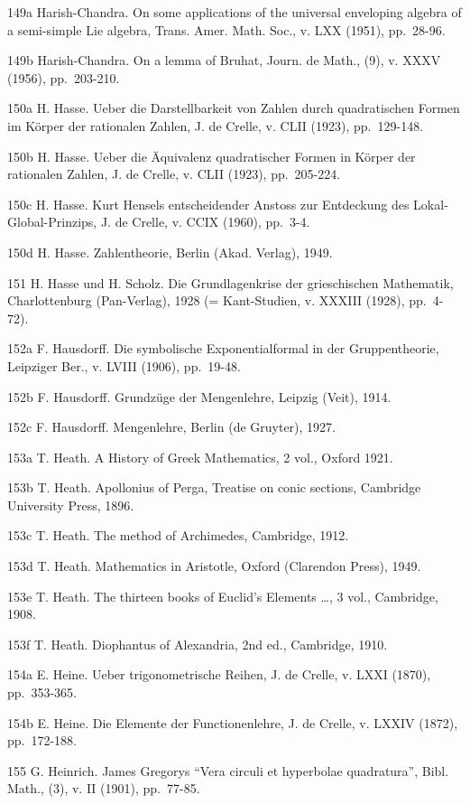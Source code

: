 149a Harish-Chandra. On some applications of the universal enveloping algebra of a semi-simple Lie algebra, Trans. Amer. Math. Soc., v. LXX (1951), pp.~28-96.

149b Harish-Chandra. On a lemma of Bruhat, Journ. de Math., (9), v. XXXV (1956), pp.~203-210.

150a H. Hasse. Ueber die Darstellbarkeit von Zahlen durch quadratischen Formen im Körper der rationalen Zahlen, J. de Crelle, v. CLII (1923), pp.~129-148.

150b H. Hasse. Ueber die Äquivalenz quadratischer Formen in Körper der rationalen Zahlen, J. de Crelle, v. CLII (1923), pp.~205-224.

150c H. Hasse. Kurt Hensels entscheidender Anstoss zur Entdeckung des Lokal-Global-Prinzips, J. de Crelle, v. CCIX (1960), pp.~3-4.

150d H. Hasse. Zahlentheorie, Berlin (Akad. Verlag), 1949.

151 H. Hasse und H. Scholz. Die Grundlagenkrise der grieschischen Mathematik, Charlottenburg (Pan-Verlag), 1928 (= Kant-Studien, v. XXXIII (1928), pp.~4-72).

152a F. Hausdorff. Die symbolische Exponentialformal in der Gruppentheorie, Leipziger Ber., v. LVIII (1906), pp.~19-48.

152b F. Hausdorff. Grundzüge der Mengenlehre, Leipzig (Veit), 1914.

152c F. Hausdorff. Mengenlehre, Berlin (de Gruyter), 1927.

153a T. Heath. A History of Greek Mathematics, 2 vol., Oxford 1921.

153b T. Heath. Apollonius of Perga, Treatise on conic sections, Cambridge University Press, 1896.

153c T. Heath. The method of Archimedes, Cambridge, 1912.

153d T. Heath. Mathematics in Aristotle, Oxford (Clarendon Press), 1949.

153e T. Heath. The thirteen books of Euclid's Elements \ldots, 3 vol., Cambridge, 1908.

153f T. Heath. Diophantus of Alexandria, 2nd ed., Cambridge, 1910.

154a E. Heine. Ueber trigonometrische Reihen, J. de Crelle, v. LXXI (1870), pp.~353-365.

154b E. Heine. Die Elemente der Functionenlehre, J. de Crelle, v. LXXIV (1872), pp.~172-188.

155 G. Heinrich. James Gregorys ``Vera circuli et hyperbolae quadratura'', Bibl. Math., (3), v. II (1901), pp.~77-85.

